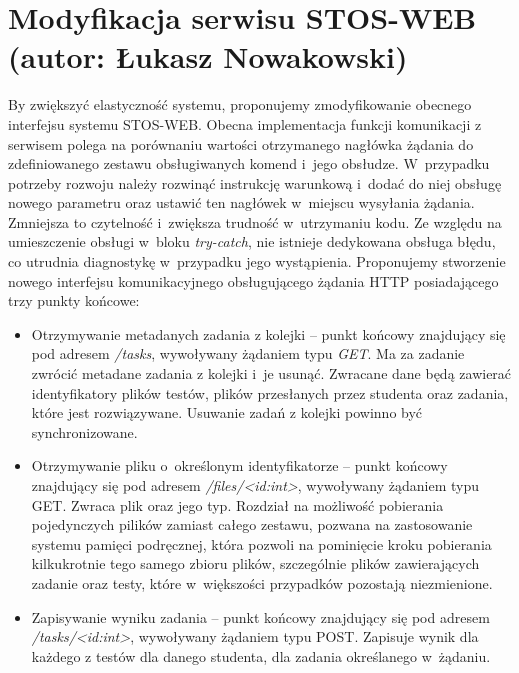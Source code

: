 
\section{Modyfikacja serwisu STOS-WEB (autor: Łukasz Nowakowski)}
By zwiększyć elastyczność systemu, proponujemy zmodyfikowanie obecnego interfejsu systemu STOS-WEB. Obecna implementacja funkcji komunikacji z serwisem polega na porównaniu wartości otrzymanego nagłówka żądania do zdefiniowanego zestawu obsługiwanych komend i~jego obsłudze. W~przypadku potrzeby rozwoju należy rozwinąć instrukcję warunkową i~dodać do niej obsługę nowego parametru oraz ustawić ten nagłówek w~miejscu wysyłania żądania. Zmniejsza to czytelność i~zwiększa trudność w~utrzymaniu kodu. Ze względu na umieszczenie obsługi w~bloku \textit{try-catch}, nie istnieje dedykowana obsługa błędu, co utrudnia diagnostykę w~przypadku jego wystąpienia. Proponujemy stworzenie nowego interfejsu komunikacyjnego obsługującego żądania HTTP posiadającego trzy punkty końcowe:
\begin{itemize}
    \item Otrzymywanie metadanych zadania z kolejki -- punkt końcowy znajdujący się pod adresem \textit{/tasks}, wywoływany żądaniem typu \textit{GET}. Ma za zadanie zwrócić metadane zadania z kolejki i~je usunąć. Zwracane dane będą zawierać identyfikatory plików testów, plików przesłanych przez studenta oraz zadania, które jest rozwiązywane. Usuwanie zadań z kolejki powinno być synchronizowane.
    \item Otrzymywanie pliku o~określonym identyfikatorze -- punkt końcowy znajdujący się pod adresem \textit{/files/<id:int>}, wywoływany żądaniem typu GET. Zwraca plik oraz jego typ. Rozdział na możliwość pobierania pojedynczych pilików zamiast całego zestawu, pozwana na zastosowanie systemu pamięci podręcznej, która pozwoli na pominięcie kroku pobierania kilkukrotnie tego samego zbioru plików, szczególnie plików zawierających zadanie oraz testy, które w~większości przypadków pozostają niezmienione.
    \item Zapisywanie wyniku zadania -- punkt końcowy znajdujący się pod adresem \textit{/tasks/<id:int>}, wywoływany żądaniem typu POST. Zapisuje wynik dla każdego z testów dla danego studenta, dla zadania określanego w~żądaniu.
\end{itemize}

